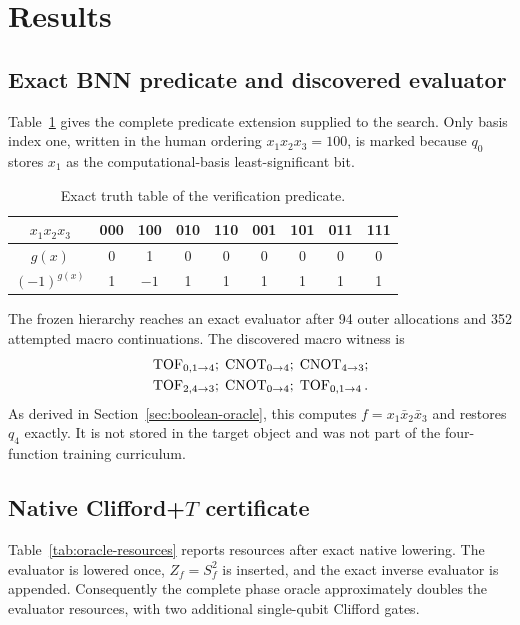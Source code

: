 \section{Results}
\label{sec:results}

\subsection{Exact BNN predicate and discovered evaluator}

Table~\ref{tab:bnn-truth} gives the complete predicate extension supplied to the search.  Only basis index one, written in the human ordering $x_1x_2x_3=100$, is marked because $q_0$ stores $x_1$ as the computational-basis least-significant bit.

\begin{table}[t]
\caption{Exact truth table of the verification predicate.}
\label{tab:bnn-truth}
\centering
\begin{tabular}{ccccccccc}
\toprule
$x_1x_2x_3$ & 000&100&010&110&001&101&011&111\\
\midrule
$g(x)$ &0&1&0&0&0&0&0&0\\
$(-1)^{g(x)}$ &1&$-1$&1&1&1&1&1&1\\
\bottomrule
\end{tabular}
\end{table}

The frozen hierarchy reaches an exact evaluator after 94 outer allocations and 352 attempted macro continuations.  The discovered macro witness is
\begin{equation}
\begin{aligned}
&\operatorname{TOF}_{0,1\to4};\;
\operatorname{CNOT}_{0\to4};\;
\operatorname{CNOT}_{4\to3};\\
&\operatorname{TOF}_{2,4\to3};\;
\operatorname{CNOT}_{0\to4};\;
\operatorname{TOF}_{0,1\to4}.
\end{aligned}
\label{eq:found-macro-witness}
\end{equation}
As derived in Section~\ref{sec:boolean-oracle}, this computes $f=x_1\bar x_2\bar x_3$ and restores $q_4$ exactly.  It is not stored in the target object and was not part of the four-function training curriculum.

\subsection{Native Clifford+$T$ certificate}

Table~\ref{tab:oracle-resources} reports resources after exact native lowering.  The evaluator is lowered once, $Z_f=S_f^2$ is inserted, and the exact inverse evaluator is appended.  Consequently the complete phase oracle approximately doubles the evaluator resources, with two additional single-qubit Clifford gates.

